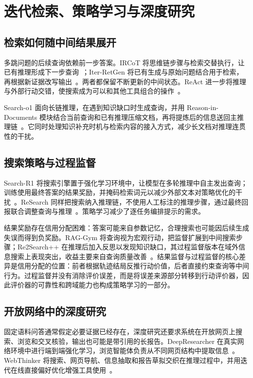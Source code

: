 \section{迭代检索、策略学习与深度研究}
\label{sec:iterative}

\subsection{检索如何随中间结果展开}

多跳问题的后续查询依赖前一步答案。IRCoT 将思维链步骤与检索交替执行，让已有推理形成下一步查询~\citep{trivedi2023ircot}；Iter-RetGen 将已有生成与原始问题结合用于检索，再根据新证据改写输出~\citep{shao2023iterretgen}。两者都保留不断更新的中间状态。ReAct 进一步将推理与外部行动交错，使搜索成为可以和其他工具组合的操作~\citep{yao2023react}。

Search-o1 面向长链推理，在遇到知识缺口时生成查询，并用 Reason-in-Documents 模块结合当前查询和已有推理压缩文档，再将提炼后的信息送回主推理链~\citep{li2025searcho1}。它同时处理知识补充时机与检索内容的接入方式，减少长文档对推理连贯性的干扰。

\subsection{搜索策略与过程监督}

Search-R1 将搜索引擎置于强化学习环境中，让模型在多轮推理中自主发出查询；训练使用最终答案的结果奖励，并掩码检索词元以减少外部文本对策略优化的干扰~\citep{jin2025searchr1}。ReSearch 同样把搜索纳入推理链，不使用人工标注的推理步骤，通过最终回报联合调整查询与推理~\citep{chen2025research}。策略学习减少了逐任务编排提示的需求。

结果奖励存在信用分配困难：答案可能来自参数记忆，合理搜索也可能因后续生成失误而得到负奖励。RAG-Gym 将查询视为宏观行动，把监督扩展到中间搜索步骤；Re2Search++ 在推理后加入反思以发现知识缺口，其过程监督版本在域外信息搜索上表现突出，收益主要来自查询质量改善~\citep{xiong2026process}。结果监督与过程监督的核心差异是信用分配的位置：前者根据轨迹结局反推行动价值，后者直接约束查询等中间行为。过程监督并没有消除评价误差，而是将误差来源部分转移到行动评价器，因此评价器的可靠性和跨域能力也构成策略学习的一部分。

\subsection{开放网络中的深度研究}

固定语料问答通常假定必要证据已经存在，深度研究还要求系统在开放网页上搜索、浏览和交叉核验，输出也可能是带引用的长报告。DeepResearcher 在真实网络环境中进行端到端强化学习，浏览智能体负责从不同网页结构中提取信息~\citep{zheng2025deepresearcher}。WebThinker 将搜索、网页导航、信息抽取和报告草拟交织在推理过程中，并用迭代在线直接偏好优化增强工具使用~\citep{li2025webthinker}。

